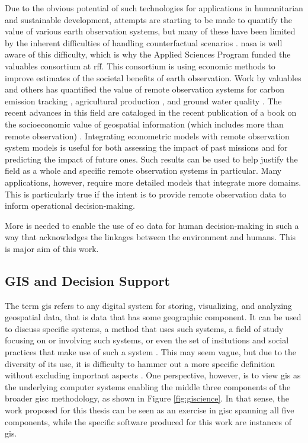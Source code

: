 \documentclass[notitlepage]{article}
\begin{document}
\color{OliveGreen}

Due to the obvious potential of such technologies for applications in humanitarian and sustainable development, attempts are starting to be made to quantify the value of various earth observation systems, but many of these have been limited by the inherent difficulties of handling counterfactual scenarios \cite{macauleyValueInformationMeasuring2006}. \ac{nasa} is well aware of this difficulty, which is why the Applied Sciences Program funded the \ac{valuables} consortium at \ac{rff}. This consortium is using economic methods to improve estimates of the societal benefits of earth observation. Work by \ac{valuables} and others has quantified the value of remote observation systems for carbon emission tracking \cite{cookeUsingSocialCost2016}, agricultural production \cite{forneyEconomicValueRemoteSensing2012}, and ground water quality \cite{forneyEconomicValueRemoteSensing2012}. The recent advances in this field are cataloged in the recent publication of a book on the socioeconomic value of geospatial information (which includes more than remote observation) \cite{kruseGEOValueSocioeconomicValue2017}. Integrating econometric models with remote observation system models is useful for both assessing the impact of past missions and for predicting the impact of future ones. Such results can be used to help justify the field as a whole and specific remote observation systems in particular. Many applications, however, require more detailed models that integrate more domains. This is particularly true if the intent is to provide remote observation data to inform operational decision-making.

\color{black}

More is needed to enable the use of \ac{eo} data for human decision-making in such a way that acknowledges the linkages between the environment and humans. This is major aim of this work. 


\subsection{GIS and Decision Support} \label{sec:gis}

The term \ac{gis} refers to any digital system for storing, visualizing, and analyzing geospatial data, that is data that has some geographic component. It can be used to discuss specific systems, a method that uses such systems, a field of study focusing on or involving such systems, or even the set of insitutions and social practices that make use of such a system \cite{sheppardGISSocietyResearch1995}. This may seem vague, but due to the diversity of its use, it is difficulty to hammer out a more specific definition without excluding important aspects \cite{goodchildOverviewDefinitionGIS1992, picklesToolScienceGIS1997, chrismanWhatDoesGIS1999, heikkilaGISDeadLong1998}. One perspective, however, is to view \ac{gis} as the underlying computer systems enabling the middle three components of the broader \ac{gisc} methodology, as shown in Figure \ref{fig:giscience}. In that sense, the work proposed for this thesis can be seen as an exercise in \ac{gisc} spanning all five components, while the specific software produced for this work are instances of \ac{gis}. 
\end{document}
